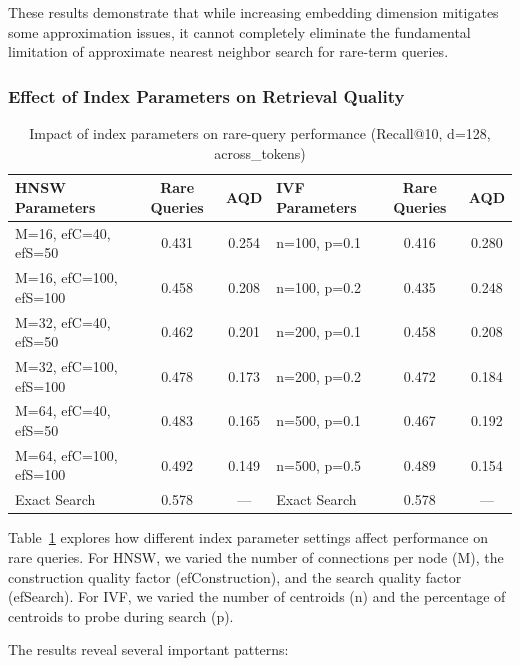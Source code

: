 \documentclass[sigconf,review]{acmart}
\begin{document}
These results demonstrate that while increasing embedding dimension mitigates some approximation issues, it cannot completely eliminate the fundamental limitation of approximate nearest neighbor search for rare-term queries.

\subsubsection{Effect of Index Parameters on Retrieval Quality}

\begin{table}[t]
\caption{Impact of index parameters on rare-query performance (Recall@10, d=128, across\_tokens)}
\label{tab:index_params}
\centering
\begin{tabular}{lcclcc}
\toprule
HNSW Parameters & Rare Queries & AQD & IVF Parameters & Rare Queries & AQD \\
\midrule
M=16, efC=40, efS=50 & 0.431 & 0.254 & n=100, p=0.1 & 0.416 & 0.280 \\
M=16, efC=100, efS=100 & 0.458 & 0.208 & n=100, p=0.2 & 0.435 & 0.248 \\
M=32, efC=40, efS=50 & 0.462 & 0.201 & n=200, p=0.1 & 0.458 & 0.208 \\
M=32, efC=100, efS=100 & 0.478 & 0.173 & n=200, p=0.2 & 0.472 & 0.184 \\
M=64, efC=40, efS=50 & 0.483 & 0.165 & n=500, p=0.1 & 0.467 & 0.192 \\
M=64, efC=100, efS=100 & 0.492 & 0.149 & n=500, p=0.5 & 0.489 & 0.154 \\
Exact Search & 0.578 & --- & Exact Search & 0.578 & --- \\
\bottomrule
\end{tabular}
\end{table}

Table~\ref{tab:index_params} explores how different index parameter settings affect performance on rare queries. For HNSW, we varied the number of connections per node (M), the construction quality factor (efConstruction), and the search quality factor (efSearch). For IVF, we varied the number of centroids (n) and the percentage of centroids to probe during search (p).

The results reveal several important patterns:
\end{document}
